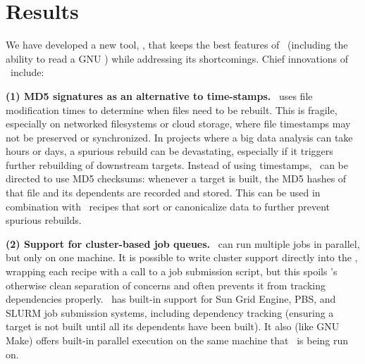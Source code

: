 \section*{Results}

We have developed a new tool, \biomake, that keeps the best features of \make\ (including the ability to read a GNU \Makefile) while addressing its shortcomings.
Chief innovations of \biomake\ include:

{\bf (1) MD5 signatures as an alternative to time-stamps.}
\make\ uses file modification times to determine when files need to be rebuilt.
This is fragile, especially on networked filesystems or cloud storage, where file timestamps may not be preserved or synchronized.
In projects where a big data analysis can take hours or days, a spurious rebuild can be devastating, especially if it triggers further rebuilding of downstream targets.
Instead of using timestamps, \biomake\ can be directed to use MD5 checksums: whenever a target is built, the MD5 hashes of that file and its dependents are recorded
and stored. This can be used in combination with \Makefile\ recipes that sort or canonicalize data to further prevent spurious rebuilds.

%

{\bf (2) Support for cluster-based job queues.}
\make\ can run multiple jobs in parallel, but only on one machine.
It is possible to write cluster support directly into the \Makefile,
wrapping each recipe with a call to a job submission script,
but this spoils \make's otherwise clean separation of concerns
and often prevents it from tracking dependencies properly.
\biomake\ has built-in support for Sun Grid Engine, PBS, and SLURM job submission systems,
including dependency tracking (ensuring a target is not built until all its dependents have been built).
It also (like GNU Make) offers built-in parallel execution on
the same machine that \biomake\ is being run on.

